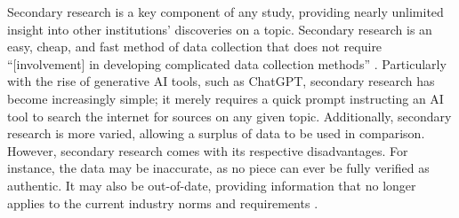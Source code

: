 Secondary research is a key component of any study, providing nearly unlimited insight into other institutions’ discoveries on a topic. Secondary research is an easy, cheap, and fast method of data collection that does not require “[involvement] in developing complicated data collection methods” \citep{Nasrudin25}. Particularly with the rise of generative AI tools, such as ChatGPT, secondary research has become increasingly simple; it merely requires a quick prompt instructing an AI tool to search the internet for sources on any given topic. Additionally, secondary research is more varied, allowing a surplus of data to be used in comparison. However, secondary research comes with its respective disadvantages. For instance, the data may be inaccurate, as no piece can ever be fully verified as authentic. It may also be out-of-date, providing information that no longer applies to the current industry norms and requirements \citep{Nasrudin25}.

